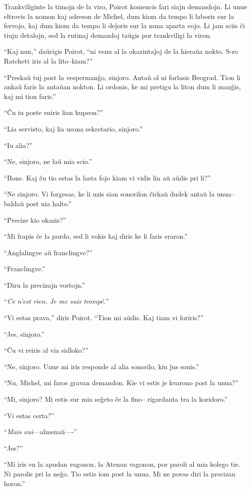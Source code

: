 Trankviliginte la timojn de la viro, Poirot komencis fari siajn demandojn. Li unue eltrovis la nomon kaj adreson de Michel, dum kiom da tempo li laboris sur la fervojo, kaj dum kiom da tempo li deĵoris sur la nuna aparta vojo. Li jam sciis ĉi tiujn detalojn, sed la rutinaj demandoj taŭgis por trankviligi la viron.

``Kaj nun,'' daŭrigis Poirot, ``ni venu al la okazintaĵoj de la hieraŭa nokto. S-ro Ratchett iris al la lito--kiam?''

``Preskaŭ tuj post la vespermanĝo, sinjoro. Antaŭ ol ni forlasis Beograd. Tion li ankaŭ faris la antaŭan nokton. Li ordonis, ke mi pretigu la liton dum li manĝis, kaj mi tion faris.''

``Ĉu iu poste eniris lian kupeon?''

``Lia servisto, kaj lia usona sekretario, sinjoro.''

``Iu alia?''

``Ne, sinjoro, ne laŭ mia scio.''

``Bone. Kaj ĉu tio estas la lasta fojo kiam vi vidis lin aŭ aŭdis pri li?''

``Ne sinjoro. Vi forgesas, ke li uzis sian sonorilon ĉirkaŭ dudek antaŭ la unua-- baldaŭ post nia halto.''

``Precize kio okazis?''

``Mi frapis ĉe la pordo, sed li vokis kaj diris ke li faris eraron.''

``Anglalingve aŭ franclingve?''

``Franclingve.''

``Diru la precizajn vortojn.''

``\emph{Ce n'est rien. Je me suis trompé.}''

``Vi estas prava,'' diris Poirot. ``Tion mi aŭdis. Kaj tiam vi foriris?''

``Jes, sinjoro.''

``Ĉu vi reiris al via sidloko?''

``Ne, sinjoro. Unue mi iris responde al alia sonorilo, kiu ĵus sonis.''

``Nu, Michel, mi faros gravan demandon. Kie vi estis je kvarono post la unua?''

``Mi, sinjoro? Mi estis sur mia seĝeto ĉe la fino-- rigardanta tra la koridoro.''

``Vi estas certa?''

``\emph{Mais oui}---almenaŭ----''

``Jes?''

``Mi iris en la apudan vagonon, la Atenan vagonon, por paroli al mia kolego tie. Ni parolis pri la neĝo. Tio estis iom post la unua. Mi ne povas diri la precizan horon.''

